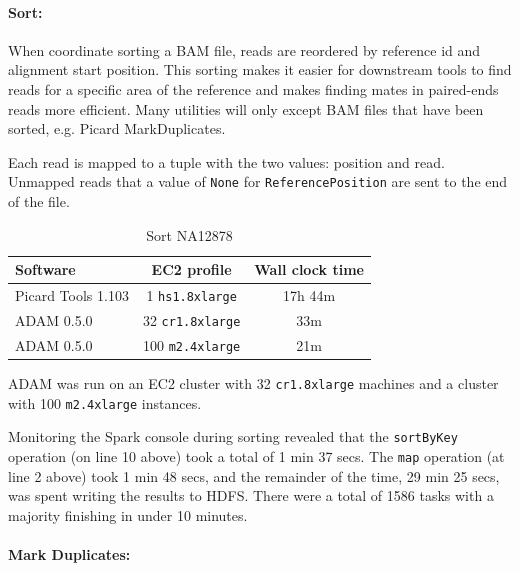 \documentclass[10pt,twocolumn]{article}
\theoremstyle{plain}
\begin{document}
\paragraph{Sort:}
\label{sec:sort}

When coordinate sorting a BAM file, reads are reordered by reference id and alignment start position.
This sorting makes it easier for downstream tools to find reads for a specific area of the reference
and makes finding mates in paired-ends reads more efficient. Many utilities will only except 
BAM files that have been sorted, e.g. Picard MarkDuplicates.

Each read is mapped to a tuple with the two values: position and read.
Unmapped reads that a value of \texttt{None} for \texttt{ReferencePosition}
are sent to the end of the file.

\begin{table}[h]
\caption{Sort NA12878}
\label{tab:time-flagstat}
\begin{scriptsize}
\begin{center}
\begin{tabular}{| l | c | c |}
\hline
\bf Software & \bf EC2 profile & \bf Wall clock time \\
\hline
Picard Tools 1.103 & 1 \texttt{hs1.8xlarge} & 17h 44m \\
ADAM 0.5.0 & 32 \texttt{cr1.8xlarge} & 33m \\
ADAM 0.5.0 & 100 \texttt{m2.4xlarge} & 21m \\
\hline
\end{tabular}
\end{center}
\end{scriptsize}
\end{table}

ADAM was run on an EC2 cluster with 32 \texttt{cr1.8xlarge} machines and
a cluster with 100 \texttt{m2.4xlarge} instances.

Monitoring the Spark console during sorting revealed that the \texttt{sortByKey}
operation (on line 10 above) took a total of 1 min 37 secs. The \texttt{map} operation
(at line 2 above) took 1 min 48 secs, and the remainder of the time, 29 min 25 secs, was 
spent writing the results to HDFS. There were a total of 1586 tasks with a majority
finishing in under 10 minutes.

\paragraph{Mark Duplicates:}
\label{sec:mark-duplicates}
\end{document}
